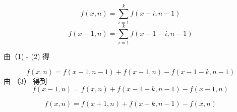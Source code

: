 \documentclass[10pt,a4paper]{article}
\begin{document}
	

	\begin{equation}
		f(x,n) = \sum_{i=1}^{k}f(x-i,n-1)
	\end{equation}
	\begin{equation}
		f(x-1,n) = \sum_{i=1}^{k}f(x-1-i,n-1)
	\end{equation}
	
	由（1) - (2) 得
		
		\begin{equation}
			f(x,n) = f(x-1,n-1) + f(x-1,n) - f(x-1-k,n-1)
		\end{equation}
	由 （3）  得到
	 \begin{equation}
	 	f(x-1,n) = f(x,n) + f(x-1-k,n-1)  -f(x-1,n)
	 \end{equation}
 
 \begin{equation}
 	f(x,n) = f(x+1,n) + f(x-k,n-1) - f(x,n)
 \end{equation}
	
	
	
	
	
\end{document}
